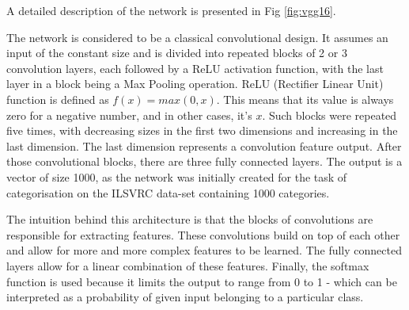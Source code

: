 A detailed description of the network is presented in Fig \ref{fig:vgg16}.

The network is considered to be a classical convolutional design.
It assumes an input of the constant size and is divided into repeated blocks of 2 or 3 convolution layers, each followed by a ReLU activation function, with the last layer in a block being a Max Pooling operation.
ReLU (Rectifier Linear Unit) function is defined as $f(x) = max(0,x)$.
This means that its value is always zero for a negative number, and in other cases, it's $x$.
Such blocks were repeated five times, with decreasing sizes in the first two dimensions and increasing in the last dimension.
The last dimension represents a convolution feature output.
After those convolutional blocks, there are three fully connected layers.
The output is a vector of size 1000, as the network was initially created for the task of categorisation on the ILSVRC data-set containing 1000 categories.

The intuition behind this architecture is that the blocks of convolutions are responsible for extracting features.
These convolutions build on top of each other and allow for more and more complex features to be learned.
The fully connected layers allow for a linear combination of these features.
Finally, the softmax function is used because it limits the output to range from 0 to 1 - which can be interpreted as a probability of given input belonging to a particular class.





